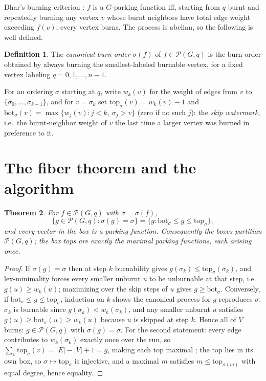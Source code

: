 \documentclass[11pt]{amsart}
\newtheorem{theorem}{Theorem}[section]
\theoremstyle{definition}
\newtheorem{definition}[theorem]{Definition}
\newcommand{\PF}{\mathcal{P}}
\begin{document}
Dhar's burning criterion \cite{dhar}: $f$ is a $G$-parking function iff,
starting from $q$ burnt and repeatedly burning any vertex $v$ whose burnt
neighbors have total edge weight exceeding $f(v)$, every vertex burns. The
process is abelian, so the following is well defined.

\begin{definition}
The \emph{canonical burn order} $\sigma(f)$ of $f\in\PF(G,q)$ is the burn
order obtained by always burning the smallest-labeled burnable vertex, for a
fixed vertex labeling $q=0,1,\dots,n-1$.
\end{definition}

For an ordering $\sigma$ starting at $q$, write $w_k(v)$ for the weight of
edges from $v$ to $\{\sigma_0,\dots,\sigma_{k-1}\}$, and for $v = \sigma_k$
set $\mathrm{top}_\sigma(v) = w_k(v)-1$ and
$\mathrm{bot}_\sigma(v) = \max\{ w_j(v) : j<k,\ \sigma_j > v \}$ (zero if no
such $j$): the \emph{skip watermark}, i.e.\ the burnt-neighbor weight of $v$
the last time a larger vertex was burned in preference to it.

\section{The fiber theorem and the algorithm}\label{sec:algo}

\begin{theorem}\label{thm:fiber}
For $f\in\PF(G,q)$ with $\sigma=\sigma(f)$,
\[
\{g\in\PF(G,q):\sigma(g)=\sigma\}
 = \{g : \mathrm{bot}_\sigma \le g \le \mathrm{top}_\sigma\},
\]
and every vector in the box is a parking function. Consequently the boxes
partition $\PF(G,q)$; the box tops are exactly the maximal parking
functions, each arising once.
\end{theorem}

\begin{proof}
If $\sigma(g)=\sigma$ then at step $k$ burnability gives
$g(\sigma_k)\le\mathrm{top}_\sigma(\sigma_k)$, and lex-minimality forces
every smaller unburnt $u$ to be unburnable at that step, i.e.\
$g(u)\ge w_k(u)$; maximizing over the skip steps of $u$ gives
$g\ge\mathrm{bot}_\sigma$. Conversely, if
$\mathrm{bot}_\sigma\le g\le\mathrm{top}_\sigma$, induction on $k$ shows the
canonical process for $g$ reproduces $\sigma$: $\sigma_k$ is burnable since
$g(\sigma_k)<w_k(\sigma_k)$, and any smaller unburnt $u$ satisfies
$g(u)\ge\mathrm{bot}_\sigma(u)\ge w_k(u)$ because $u$ is skipped at step
$k$. Hence all of $V$ burns: $g\in\PF(G,q)$ with $\sigma(g)=\sigma$.
For the second statement: every edge contributes to
$w_k(\sigma_k)$ exactly once over the run, so
$\sum_v \mathrm{top}_\sigma(v) = |E|-|V|+1 = g$, making each top maximal
\cite[Prop.~2.3, Cor.~3.2]{bct}; the top lies in its own box, so
$\sigma\mapsto\mathrm{top}_\sigma$ is injective, and a maximal $m$ satisfies
$m\le \mathrm{top}_{\sigma(m)}$ with equal degree, hence equality.
\end{proof}
\end{document}

